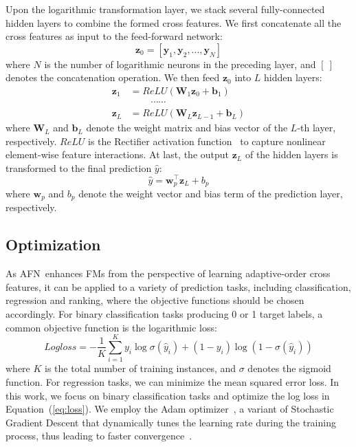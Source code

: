 \documentclass[letterpaper]{article} \usepackage{aaai20}  \usepackage{times}  \usepackage{helvet} \usepackage{courier}  \usepackage[hyphens]{url}  \usepackage{graphicx} \urlstyle{rm} \def\UrlFont{\rm}  \usepackage{graphicx}  \frenchspacing  \setlength{\pdfpagewidth}{8.5in}  \setlength{\pdfpageheight}{11in}
\newcommand{\model}{{AFN}~}
\begin{document}
Upon the logarithmic transformation layer, we stack several fully-connected hidden layers to combine the formed cross features. We first concatenate all the cross features as input to the feed-forward network:
\begin{equation}
\mathbf{z}_0 = [\mathbf{y}_1,\mathbf{y}_2,...,\mathbf{y}_N] 
\end{equation}
where $N$ is the number of logarithmic neurons in the preceding layer, and $[\ ]$ denotes the concatenation operation. We then feed $\mathbf{z}_0$ into $L$ hidden layers:
\begin{equation}
\begin{split}
	\mathbf{z}_1 &= ReLU(\mathbf{W}_1\mathbf{z}_0+\mathbf{b}_1) \\
	&~~~~~~~~~~\cdots \cdots \\
	\mathbf{z}_L &= ReLU(\mathbf{W}_L\mathbf{z}_{L-1}+\mathbf{b}_L)
\end{split}
\end{equation}
where $\mathbf{W}_L$ and $\mathbf{b}_L$ denote the weight matrix and bias vector of the $L$-th layer, respectively. $ReLU$ is the Rectifier activation function~\cite{Relu} to capture nonlinear element-wise feature interactions.
At last, the output $\mathbf{z}_L$ of the hidden layers is transformed to the final prediction $\hat{y}$:
\begin{equation}
\hat{y}=\mathbf{w}_p^\top\mathbf{z}_{L}+b_p
\end{equation}
where $\mathbf{w}_p$ and $b_p$ denote the weight vector and bias term of the prediction layer, respectively.

\subsection{Optimization}

As \model enhances FMs from the perspective of learning adaptive-order cross features, it can be applied to a variety of prediction tasks, including classification, regression and ranking, where the objective functions should be chosen accordingly.  
For binary classification tasks producing 0 or 1 target labels, a common objective function is the logarithmic loss:
\small
\begin{equation}\label{eq:loss}
Logloss = -\frac{1}{K}\sum_{i=1}^K y_i \log\sigma(\hat{y}_i)+ (1-y_i)\log(1-\sigma(\hat{y}_i))
\end{equation} 
\normalsize
where $K$ is the total number of training instances, and $\sigma$ denotes the sigmoid function. For regression tasks, we can minimize the mean squared error loss. In this work, we focus on binary classification tasks and optimize the log loss in Equation~(\ref{eq:loss}). 
We employ the Adam optimizer~\cite{Adam}, a variant of Stochastic Gradient Descent that dynamically tunes the learning rate during the training process, thus leading to faster convergence~\cite{DBLP:conf/dasfaa/SunSJ0LXW19}.
\end{document}
